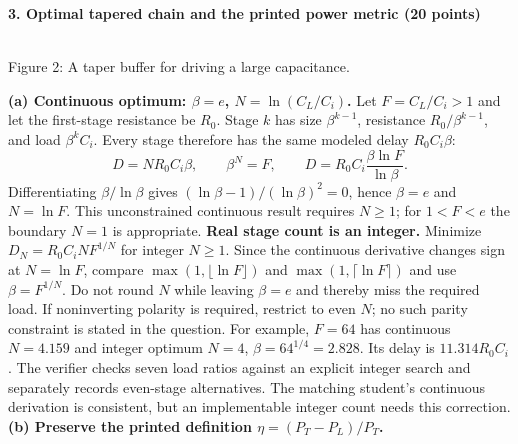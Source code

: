 \documentclass[10pt]{article}
\newcommand{\ground}[2]{\draw (#1,#2)--(#1,{#2-.12});\draw ({#1-.17},{#2-.12})--({#1+.17},{#2-.12});\draw ({#1-.11},{#2-.20})--({#1+.11},{#2-.20});}
\newcommand{\qheading}[1]{\par\medskip\textbf{#1}\par}
\begin{document}
\qheading{3. Optimal tapered chain and the printed power metric (20 points)}
\begin{center}\\\small Figure 2: A taper buffer for driving a large capacitance.\end{center}
\textbf{(a) Continuous optimum: $\beta=e$, $N=\ln(C_L/C_i)$.}
Let $F=C_L/C_i>1$ and let the first-stage resistance be $R_0$. Stage $k$ has size $\beta^{k-1}$, resistance $R_0/\beta^{k-1}$, and load $\beta^kC_i$. Every stage therefore has the same modeled delay $R_0C_i\beta$:
\[D=NR_0C_i\beta,\qquad \beta^N=F,\qquad D=R_0C_i\frac{\beta\ln F}{\ln\beta}.\]
Differentiating $\beta/\ln\beta$ gives $(\ln\beta-1)/(\ln\beta)^2=0$, hence $\beta=e$ and $N=\ln F$. This unconstrained continuous result requires $N\ge1$; for $1<F<e$ the boundary $N=1$ is appropriate.
\newpage
\textbf{Real stage count is an integer.} Minimize $D_N=R_0C_iNF^{1/N}$ for integer $N\ge1$. Since the continuous derivative changes sign at $N=\ln F$, compare $\max(1,\lfloor\ln F\rfloor)$ and $\max(1,\lceil\ln F\rceil)$ and use $\beta=F^{1/N}$. Do not round $N$ while leaving $\beta=e$ and thereby miss the required load. If noninverting polarity is required, restrict to even $N$; no such parity constraint is stated in the question.
For example, $F=64$ has continuous $N=4.159$ and integer optimum $N=4$, $\beta=64^{1/4}=2.828$. Its delay is $11.314R_0C_i$. The verifier checks seven load ratios against an explicit integer search and separately records even-stage alternatives. The matching student's continuous derivation is consistent, but an implementable integer count needs this correction.
\textbf{(b) Preserve the printed definition $\eta=(P_T-P_L)/P_T$.}
\end{document}
